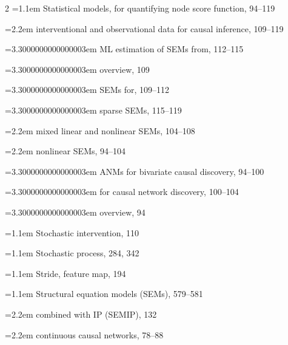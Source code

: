 \begin{multicols}{2}
\noindent\hangindent=1.1em Statistical models, for quantifying node score function, 94--119\par
\noindent\hangindent=2.2em \hspace*{1.1em}interventional and observational data for causal inference, 109--119\par
\noindent\hangindent=3.3000000000000003em \hspace*{2.2em}ML estimation of SEMs from, 112--115\par
\noindent\hangindent=3.3000000000000003em \hspace*{2.2em}overview, 109\par
\noindent\hangindent=3.3000000000000003em \hspace*{2.2em}SEMs for, 109--112\par
\noindent\hangindent=3.3000000000000003em \hspace*{2.2em}sparse SEMs, 115--119\par
\noindent\hangindent=2.2em \hspace*{1.1em}mixed linear and nonlinear SEMs, 104--108\par
\noindent\hangindent=2.2em \hspace*{1.1em}nonlinear SEMs, 94--104\par
\noindent\hangindent=3.3000000000000003em \hspace*{2.2em}ANMs for bivariate causal discovery, 94--100\par
\noindent\hangindent=3.3000000000000003em \hspace*{2.2em}for causal network discovery, 100--104\par
\noindent\hangindent=3.3000000000000003em \hspace*{2.2em}overview, 94\par
\noindent\hangindent=1.1em Stochastic intervention, 110\par
\noindent\hangindent=1.1em Stochastic process, 284, 342\par
\noindent\hangindent=1.1em Stride, feature map, 194\par
\noindent\hangindent=1.1em Structural equation models (SEMs), 579--581\par
\noindent\hangindent=2.2em \hspace*{1.1em}combined with IP (SEMIP), 132\par
\noindent\hangindent=2.2em \hspace*{1.1em}continuous causal networks, 78--88\par

\end{multicols}
